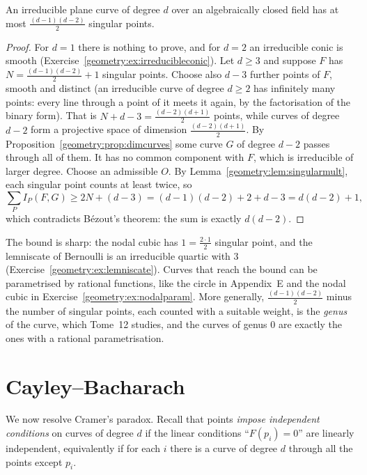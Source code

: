 \begin{theorem}\label{geometry:thm:singbound}
An irreducible plane curve of degree $d$ over an algebraically closed field has at most $\frac{(d-1)(d-2)}2$ singular points.
\end{theorem}

\begin{proof}
For $d=1$ there is nothing to prove, and for $d=2$ an irreducible conic is smooth (Exercise~\ref{geometry:ex:irreducibleconic}). Let $d\ge3$ and suppose $F$ has
$N=\frac{(d-1)(d-2)}2+1$ singular points. Choose also $d-3$ further points of $F$, smooth and distinct (an irreducible curve of degree $d\ge2$ has
infinitely many points: every line through a point of it meets it again, by the factorisation of the binary form). That is
$N+d-3=\frac{(d-2)(d+1)}2$ points, while curves of degree $d-2$ form a projective space of dimension $\frac{(d-2)(d+1)}2$. By
Proposition~\ref{geometry:prop:dimcurves} some curve $G$ of degree $d-2$ passes through all of them. It has no common component with $F$, which is irreducible of
larger degree. Choose an admissible $O$. By Lemma~\ref{geometry:lem:singularmult}, each singular point counts at least twice, so
\[
\sum_PI_P(F,G)\ge2N+(d-3)=(d-1)(d-2)+2+d-3=d(d-2)+1,
\]
which contradicts B\'ezout's theorem: the sum is exactly $d(d-2)$.
\end{proof}

The bound is sharp: the nodal cubic has $1=\frac{2\cdot1}2$ singular point, and the lemniscate of Bernoulli is an irreducible quartic with $3$
(Exercise~\ref{geometry:ex:lemniscate}). Curves that reach the bound can be parametrised by rational functions, like the circle in
Appendix~E and the nodal cubic in Exercise~\ref{geometry:ex:nodalparam}. More generally, $\frac{(d-1)(d-2)}2$ minus the number of singular points, each counted with a
suitable weight, is the \emph{genus} of the curve, which Tome~12 studies, and the curves of genus $0$ are exactly the ones with a rational parametrisation.

\section{Cayley--Bacharach}

We now resolve Cramer's paradox. Recall that points \emph{impose independent conditions} on curves of degree $d$ if the linear conditions ``$F(p_i)=0$''
are linearly independent, equivalently if for each $i$ there is a curve of degree $d$ through all the points except $p_i$.

